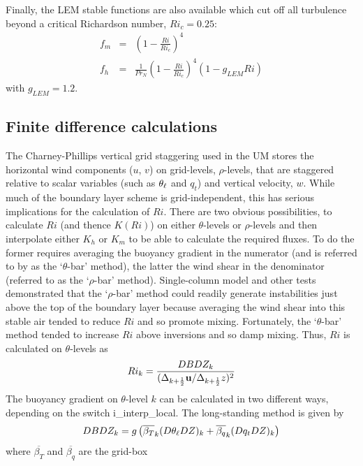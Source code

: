 \documentclass{UMDP_article}
\begin{document}
Finally, the LEM stable functions are also available which cut off all 
turbulence beyond a critical Richardson number, $Ri_c=0.25$:
\begin{eqnarray*}
  f_m & =& \left( 1 - \frac{Ri}{Ri_c} \right)^4 \\
  f_h & =& \frac{1}{Pr_N} \left( 1 - \frac{Ri}{Ri_c} \right)^4 (1 - g_{LEM} Ri)
\end{eqnarray*}
\label{stable_stab_lem}
with $g_{LEM}=1.2$.

\subsection{Finite difference calculations}
\label{sec:fd_ri}

The Charney-Phillips vertical grid staggering used in the UM stores
the horizontal wind components ($u$, $v$) on grid-levels,
$\rho$-levels, that are staggered relative to scalar variables (such
as $\theta_{\ell}$ and $q_t$) and vertical velocity, $w$.  While much of the
boundary layer scheme is grid-independent, this has serious
implications for the calculation of $Ri$.  There are two obvious
possibilities, to calculate $Ri$ (and thence $K(Ri)$) on either
$\theta$-levels or $\rho$-levels and then interpolate either $K_h$ or
$K_m$ to be able to calculate the required fluxes.  To do the former
requires averaging the buoyancy gradient in the numerator (and is
referred to by \cite{cullen1994} as the `$\theta$-bar' method), the
latter the wind shear in the denominator (referred to as the
`$\rho$-bar' method).  Single-column model and other tests
demonstrated that the `$\rho$-bar' method could readily generate
instabilities just above the top of the boundary layer because
averaging the wind shear into this stable air tended to reduce $Ri$
and so promote mixing.  Fortunately, the `$\theta$-bar' method tended
to increase $Ri$ above inversions and so damp mixing.  Thus, $Ri$ is
calculated on $\theta$-levels as
\begin{equation*}
  Ri_k = \frac{DBDZ_k}
         {(\Delta_{k+\frac{1}{2}} {\bf u}/\Delta_{k+\frac{1}{2}} z)^2}
\end{equation*}
The buoyancy gradient on $\theta$-level $k$ can be calculated in two different ways, 
depending on the switch {\rm i\_interp\_local}.  The long-standing method is given by
\begin{equation*}
  DBDZ_k = g\left( \overline{\beta_T}_{k} (D\theta_{\ell} DZ)_k
         + \overline{\beta_q}_{k} (Dq_t DZ)_k    \right)
\end{equation*}
where $\overline{\beta_T}$ and $\overline{\beta_q}$ are the grid-box
\end{document}
